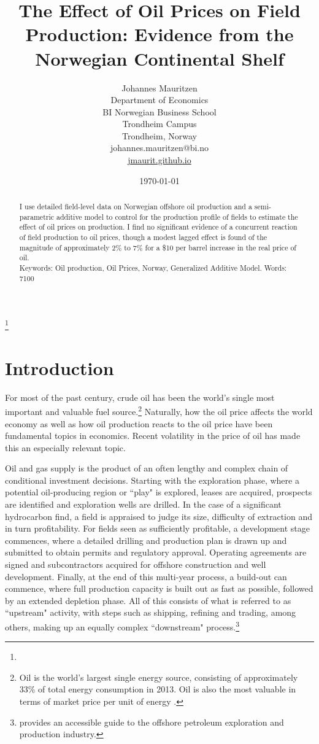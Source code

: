 \documentclass[12pt]{article}
\title{The Effect of Oil Prices on Field Production: Evidence from the Norwegian Continental Shelf}
\author{Johannes Mauritzen\\
		Department of Economics\\
        BI Norwegian Business School\\
        Trondheim Campus\\
		Trondheim, Norway\\
        johannes.mauritzen@bi.no\\
        \url{jmaurit.github.io}\\
		}
\date{\today}
\begin{document}
 \begin{spacing}{1} %
	\maketitle

\begin{abstract}
I use detailed field-level data on Norwegian offshore oil production and a semi-parametric additive model to control for the production profile of fields to estimate the effect of oil prices on production. I find no significant evidence of a concurrent reaction of field production to oil prices, though a modest lagged effect is found of the magnitude of approximately 2\% to 7\% for a \$10 per barrel increase in the real price of oil.\\
Keywords: Oil production, Oil Prices, Norway, Generalized Additive Model.
Words: 7100
\end{abstract}

\thanks{}
 \end{spacing}

\section{Introduction}

For most of the past century, crude oil has been the world's single most important and valuable fuel source.\footnote{Oil is the world's largest single energy source, consisting of approximately 33\% of total energy consumption in 2013. Oil is also the most valuable in terms of market price per unit of energy \citep{british_petroleum_statistical_2013}.} Naturally, how the oil price affects the world economy as well as how oil production reacts to the oil price have been fundamental topics in economics. Recent volatility in the price of oil has made this an especially relevant topic.

Oil and gas supply is the product of an often lengthy and complex chain of conditional investment decisions. Starting with the exploration phase, where a potential oil-producing region or ``play" is explored, leases are acquired, prospects are identified and exploration wells are drilled. In the case of a significant hydrocarbon find, a field is appraised to judge its size, difficulty of extraction and in turn profitability. For fields seen as sufficiently profitable, a development stage commences, where a detailed drilling and production plan is drawn up and submitted to obtain permits and regulatory approval. Operating agreements are signed and subcontractors acquired for offshore construction and well development. Finally, at the end of this multi-year process, a build-out can commence, where full production capacity is built out as fast as possible, followed by an extended depletion phase. All of this consists of what is referred to as ``upstream" activity, with steps such as shipping, refining and trading, among others, making up an equally complex ``downstream" process.\footnote{\citet{lefler_deepwater_2011} provides an accessible guide to the offshore petroleum exploration and production industry.} 
\end{document}
